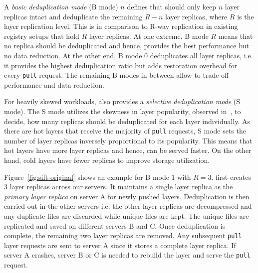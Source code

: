 A \emph{basic deduplication mode} (B mode) $n$ defines that \sysname should only
keep $n$ layer replicas intact and deduplicate the remaining $R-n$ layer
replicas, where $R$ is the layer replication level. This is in comparison to R-way replication in existing registry setups that hold $R$ layer replicas.
%
%
At one extreme, B mode $R$ means that no replica should be deduplicated and
hence, provides the best performance but no data reduction.
%
At the other end, B mode $0$ deduplicates all layer replicas, i.e. it provides
the highest deduplication ratio but adds restoration overhead for every
\texttt{pull} request.
%
The remaining B modes in between allow to trade off performance and data
reduction.
%

 

For heavily skewed workloads, \sysname also provides a \emph{selective
deduplication mode} (S mode).
%
The S mode utilizes the skewness in layer popularity, observed
in~\cite{dockerworkload}, to decide, how many replicas should be deduplicated
for each layer individually.
%
As there are hot layers that receive the majority of \texttt{pull} requests,
S mode sets the number of layer replicas inversely proportional to its
popularity.
%
This means that hot layers have more layer replicas and
hence, can be served faster.
%
On the other hand, cold layers have fewer replicas to improve storage utilization.

Figure~\ref{fig:sift-original} shows an example for B mode $1$ with $R=3$.
\sysname first creates 3 layer replicas across our servers. It maintains a single layer replica as the \emph{primary layer replica} on
server A for newly pushed layers.
%
Deduplication is then carried out in the other servers i.e. the other layer replicas are decompressed and any duplicate
files are discarded while unique files are kept.  The unique files are replicated
and saved on different servers B and C. Once deduplication is complete, the remaining two layer replicas are removed. 
%
Any subsequent \texttt{pull} layer requests are sent to server A since it
stores a complete layer replica.
%
If server A crashes, server B or C is needed to rebuild the layer and serve the
\texttt{pull} request.
%
%

